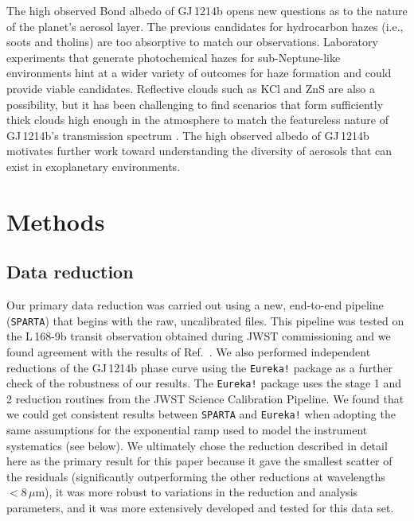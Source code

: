 \documentclass[pdflatex,sn-standardnature]{sn-jnl}%
\begin{document}
The high observed Bond albedo of GJ\,1214b opens new questions as to the nature of the planet's aerosol layer.  The previous candidates for hydrocarbon hazes (i.e., soots and tholins) are too absorptive to match our observations.  Laboratory experiments that generate photochemical hazes for sub-Neptune-like environments hint at a wider variety of outcomes for haze formation \cite{horst18,he18,gavilan18} and could provide viable candidates.  Reflective clouds such as KCl and ZnS are also a possibility, but it has been challenging to find scenarios that form sufficiently thick clouds high enough in the atmosphere to match the featureless nature of GJ\,1214b's transmission spectrum \cite{morley15, ohno18}.  The high observed albedo of GJ\,1214b motivates further work toward understanding the diversity of aerosols that can exist in exoplanetary environments.


\section*{Methods}

\renewcommand{\tablename}{Extended Data Table}
\setcounter{table}{0}

\renewcommand{\figurename}{Extended Data Fig.}
\setcounter{figure}{0}

\subsection*{Data reduction}
Our primary data reduction was carried out using a new, end-to-end pipeline (\texttt{SPARTA}) that begins with the raw, uncalibrated files. This pipeline was tested on the L\,168-9b transit observation obtained during JWST commissioning and we found agreement with the results of Ref.~\cite{bouwman22}. We also performed independent reductions of the GJ\,1214b phase curve using the \texttt{Eureka!} package \cite{eureka} as a further check of the robustness of our results. The \texttt{Eureka!} package uses the stage 1 and 2 reduction routines from the JWST Science Calibration Pipeline. We found that we could get consistent results between \texttt{SPARTA} and \texttt{Eureka!} when adopting the same assumptions for the exponential ramp used to model the instrument systematics (see below). We ultimately chose the reduction described in detail here as the primary result for this paper because it gave the smallest scatter of the residuals (significantly outperforming the other reductions at wavelengths $<8\,\mu$m), it was more robust to variations in the reduction and analysis parameters, and it was more extensively developed and tested for this data set.
\end{document}
